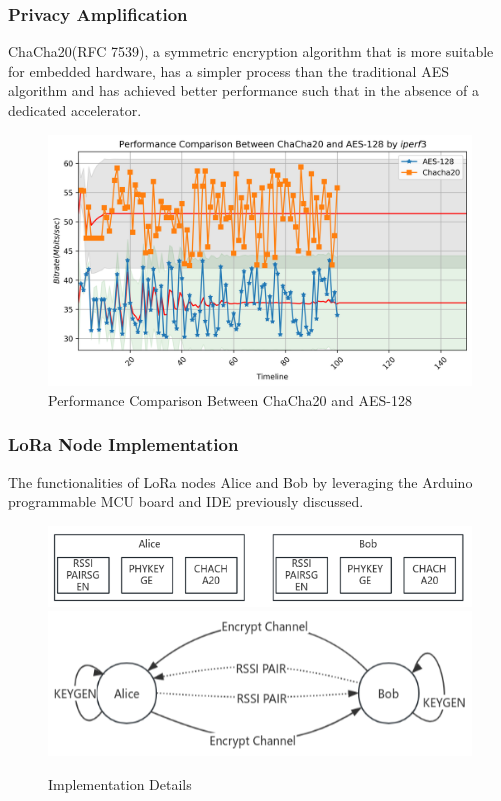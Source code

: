 \documentclass{beamer}
\begin{document}
\begin{frame}
  \frametitle{Privacy Amplification}
  ChaCha20(RFC 7539)\cite{rfc7539}, a symmetric encryption algorithm that is more suitable for embedded hardware, has a simpler process than the traditional AES algorithm and has achieved better performance such that in the absence of a dedicated accelerator\cite{7507408,7927078}.
  \begin{figure}
    \centering
    \includegraphics[width=0.67\linewidth]{../figures/fig4-2.png}
    \caption{Performance Comparison Between ChaCha20 and AES-128}
    \label{fig:4-2}
\end{figure}
\end{frame}

\begin{frame}
  \frametitle{LoRa Node Implementation}
  The functionalities of LoRa nodes Alice and Bob by leveraging the Arduino programmable MCU board and IDE previously discussed.
  \begin{figure}
    {\includegraphics[width=0.7\linewidth]{../figures/LoraImplate.png}}
    {\includegraphics[width=0.6\linewidth]{../figures/LORAtransmit.png}}
    \caption{Implementation Details}\label{Implementation Details}
  \end{figure}
\end{frame}
\end{document}
